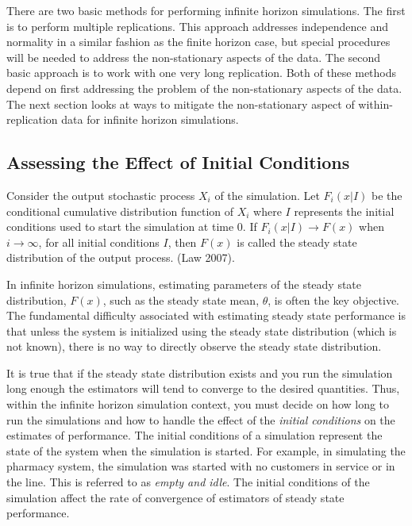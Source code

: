 \documentclass[
]{book}
\theoremstyle{definition}
\theoremstyle{definition}
\theoremstyle{definition}
\theoremstyle{definition}
\theoremstyle{remark}
\begin{document}
There are two basic methods for performing infinite horizon simulations.
The first is to perform multiple replications. This approach addresses
independence and normality in a similar fashion as the finite horizon
case, but special procedures will be needed to address the
non-stationary aspects of the data. The second basic approach is to work
with one very long replication. Both of these methods depend on first
addressing the problem of the non-stationary aspects of the data. The
next section looks at ways to mitigate the non-stationary aspect of
within-replication data for infinite horizon simulations.

\hypertarget{simoa:infhorizon:initialbias}{%
\subsection{Assessing the Effect of Initial Conditions}\label{simoa:infhorizon:initialbias}}

Consider the output stochastic process \(X_i\) of the simulation. Let
\(F_i(x|I)\) be the conditional cumulative distribution function of \(X_i\)
where \(I\) represents the initial conditions used to start the simulation
at time 0. If \(F_i(x|I) \rightarrow F(x)\) when \(i \rightarrow \infty\),
for all initial conditions \(I\), then \(F(x)\) is called the steady state
distribution of the output process. (Law 2007).

In infinite horizon simulations, estimating parameters of the steady
state distribution, \(F(x)\), such as the steady state mean, \(\theta\), is
often the key objective. The fundamental difficulty associated with
estimating steady state performance is that unless the system is
initialized using the steady state distribution (which is not known),
there is no way to directly observe the steady state distribution.

It is true that if the steady state distribution exists and you run the
simulation long enough the estimators will tend to converge to the
desired quantities. Thus, within the infinite horizon simulation
context, you must decide on how long to run the simulations and how to
handle the effect of the \emph{initial conditions} on the estimates of
performance. The initial conditions of a simulation represent the state
of the system when the simulation is started. For example, in simulating
the pharmacy system, the simulation was started with no customers in
service or in the line. This is referred to as \emph{empty and idle}. The
initial conditions of the simulation affect the rate of convergence of
estimators of steady state performance.
\end{document}
